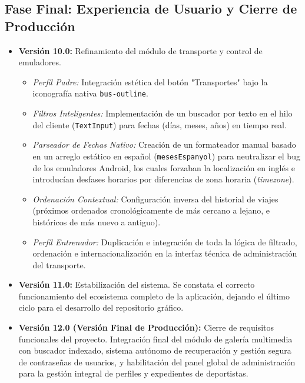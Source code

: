     \subsection{Fase Final: Experiencia de Usuario y Cierre de Producción}
    \begin{itemize}
        \item \textbf{Versión 10.0:} Refinamiento del módulo de transporte y control de emuladores. 
        \begin{itemize}
            \item \textit{Perfil Padre:} Integración estética del botón "Transportes" bajo la iconografía nativa \texttt{bus-outline}.
            \item \textit{Filtros Inteligentes:} Implementación de un buscador por texto en el hilo del cliente (\texttt{TextInput}) para fechas (días, meses, años) en tiempo real.
            \item \textit{Parseador de Fechas Nativo:} Creación de un formateador manual basado en un arreglo estático en español (\texttt{mesesEspanyol}) para neutralizar el bug de los emuladores Android, los cuales forzaban la localización en inglés e introducían desfases horarios por diferencias de zona horaria (\textit{timezone}).
            \item \textit{Ordenación Contextual:} Configuración inversa del historial de viajes (próximos ordenados cronológicamente de más cercano a lejano, e históricos de más nuevo a antiguo).
            \item \textit{Perfil Entrenador:} Duplicación e integración de toda la lógica de filtrado, ordenación e internacionalización en la interfaz técnica de administración del transporte.
        \end{itemize}
        \item \textbf{Versión 11.0:} Estabilización del sistema. Se constata el correcto funcionamiento del ecosistema completo de la aplicación, dejando el último ciclo para el desarrollo del repositorio gráfico.
        \item \textbf{Versión 12.0 (Versión Final de Producción):} Cierre de requisitos funcionales del proyecto. Integración final del módulo de galería multimedia con buscador indexado, sistema autónomo de recuperación y gestión segura de contraseñas de usuarios, y habilitación del panel global de administración para la gestión integral de perfiles y expedientes de deportistas.
    \end{itemize}
